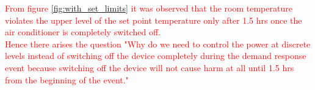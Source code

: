 \documentclass[12pt,a4paper]{article}
\begin{document}
\textcolor{red}{From figure \ref{fig:with_set_limits} it was observed that the room temperature violates the upper level of the set point temperature only after 1.5 hrs once the air conditioner is completely switched off.} \\

\textcolor{red}{Hence there arises the question "Why do we need to control the power at discrete levels instead of switching off the device completely during the demand response event because switching off the device will not cause harm at all until 1.5 hrs from the beginning of the event."}





\end{document}
